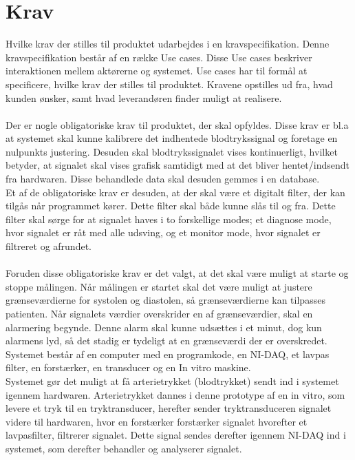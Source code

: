 \chapter{Krav}
Hvilke krav der stilles til produktet udarbejdes i en kravspecifikation. Denne kravspecifikation består af en række Use cases. Disse Use cases beskriver interaktionen mellem aktørerne og systemet. Use cases har til formål at specificere, hvilke krav der stilles til produktet. Kravene opstilles ud fra, hvad kunden ønsker, samt hvad leverandøren finder muligt at realisere. \\ \\
Der er nogle obligatoriske krav til produktet, der skal opfyldes. Disse krav er bl.a at systemet skal kunne kalibrere det indhentede blodtrykssignal og foretage en nulpunkts justering. Desuden skal blodtrykssignalet vises kontinuerligt, hvilket betyder, at signalet skal vises grafisk samtidigt med at det bliver hentet/indsendt fra hardwaren. Disse behandlede data skal desuden gemmes i en database.\\
Et af de obligatoriske krav er desuden, at der skal være et digitalt filter, der kan tilgås når programmet kører. Dette filter skal både kunne slås til og fra. Dette filter skal sørge for at signalet haves i to forskellige modes; et diagnose mode, hvor signalet er råt med alle udsving, og et monitor mode, hvor signalet er filtreret og afrundet.\\\\
Foruden disse obligatoriske krav er det valgt, at det skal være muligt at starte og stoppe målingen. Når målingen er startet skal det være muligt at justere grænseværdierne for systolen og diastolen, så grænseværdierne kan tilpasses patienten. Når signalets værdier overskrider en af grænseværdier, skal en alarmering begynde. Denne alarm skal kunne udsættes i et minut, dog kun alarmens lyd, så det stadig er tydeligt at en grænseværdi der er overskredet.\\
Systemet består af en computer med en programkode, en NI-DAQ, et lavpas filter, en forstærker, en transducer og en In vitro maskine.\\
Systemet gør det muligt at få arterietrykket (blodtrykket) sendt ind i systemet igennem hardwaren. Arterietrykket dannes i denne prototype af en in vitro, som levere et tryk til en tryktransducer, herefter sender tryktransduceren signalet videre til hardwaren, hvor en forstærker forstærker signalet hvorefter et lavpasfilter, filtrerer signalet. Dette signal sendes derefter igennem NI-DAQ ind i systemet, som derefter behandler og analyserer signalet.\\
